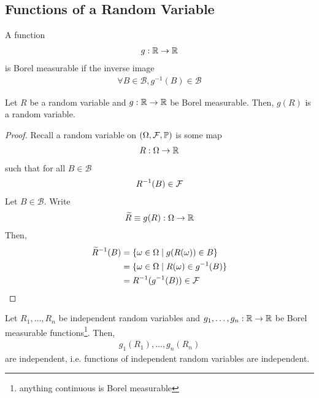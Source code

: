 \subsection{Functions of a Random Variable}
\begin{definition}
    A function
    \begin{align}
        g : \mathbb{R} \to \mathbb{R}
    \end{align}
    is Borel measurable if the inverse image
    \begin{align}
        \forall B \in \mathcal{B}, g^{-1}(B) \in \mathcal{B}
    \end{align}
\end{definition}

\begin{proposition}
    Let $R$ be a random variable and $g: \mathbb{R} \to \mathbb{R}$ be Borel measurable. Then, $g(R)$ is a random variable.
\end{proposition}
\begin{proof}
    Recall a random variable on $(\Omega, \mathcal{F}, \mathbb{P})$ is some map
    \begin{align}
        R : \Omega \to \mathbb{R}
    \end{align}
    such that for all $B \in \mathcal{B}$
    \begin{align}
        R^{-1}(B) \in \mathcal{F}
    \end{align}
    Let $B \in \mathcal{B}$. Write
    \begin{align}
        \widetilde{R} \equiv g(R) : \Omega \to \mathbb{R}
    \end{align}
    Then,
    \begin{align}
        \widetilde{R}^{-1}(B) &= \{ \omega \in \Omega \mid g(R(\omega)) \in B \}\\
        &= \{ \omega \in \Omega \mid R(\omega) \in g^{-1}(B) \}\\
        &= R^{-1}(g^{-1}(B)) \in \mathcal{F}
    \end{align}
\end{proof}

\begin{proposition}
    Let $R_1, \ldots, R_n$ be independent random variables and $g_1, \ldots, g_n: \mathbb{R} \to \mathbb{R}$ be Borel measurable functions\footnote{anything continuous is Borel measurable}. Then,
    \begin{align}
        g_1(R_1), \ldots, g_n(R_n)
    \end{align}
    are independent, i.e. functions of independent random variables are independent.
\end{proposition}

